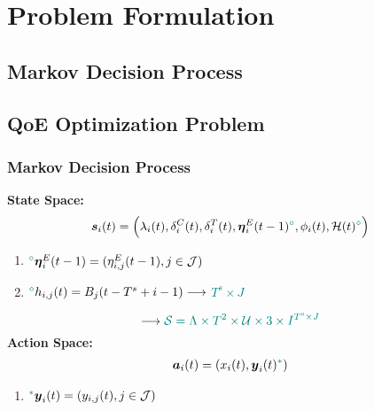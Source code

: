 \section{Problem Formulation}
\subsection{Markov Decision Process}
\subsection{QoE Optimization Problem}


\begin{frame}
	\frametitle{Markov Decision Process}
	
	
	\textbf{State Space:}
	\begin{alignat}{2}
		\boldsymbol{s}_i(t) = \Big(\lambda_i(t), \delta_i^{C}(t), \delta_i^{T}(t), \boldsymbol{\eta}_i^{E}(t-1)\textcolor{teal}{^\circ},\phi_i(t), \mathcal{H}(t)\textcolor{teal}{^\diamond} \Big)
		\label{18}
	\end{alignat}

	\begin{enumerate}[]
		
		\item  \hspace{0mm} $\textcolor{teal}{^\circ} \boldsymbol{\eta}_i^{E}(t-1) = (\eta_{i,j}^{E}(t-1), j \in \mathcal{J})$
		\vspace{2mm}
		
		\item  \hspace{0mm} $\textcolor{teal}{^\diamond} h_{i,j}(t) = B_j(t - T^{s} + i - 1)  \longrightarrow$ \textcolor{teal}{$T^{s} \times J$}
	
	\end{enumerate}

$$\longrightarrow \textcolor{teal}{\mathcal{S} =  \Lambda \times T^2 \times \mathcal{U} \times 3 \times I^{T^{\text{s}} \times J}}$$
	\vfill
	\textbf{Action Space:}
	\begin{alignat}{2}
		\boldsymbol{a}_i(t) = (x_i(t), \boldsymbol{y}_i(t)\textcolor{teal}{^*})
		\label{20}
	\end{alignat}

	\begin{enumerate}[]
	
	\item  \hspace{0mm} $\textcolor{teal}{^*} \boldsymbol{y}_i(t) = (y_{i,j}(t), j \in \mathcal{J})$
\end{enumerate}

\end{frame}

